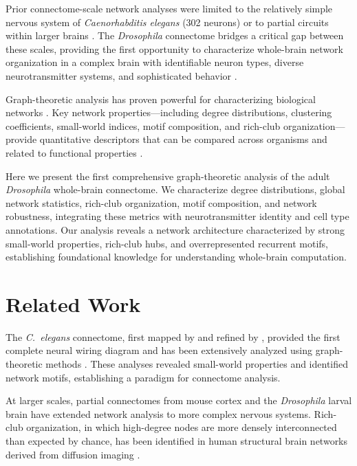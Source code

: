 \documentclass[11pt]{article}
\begin{document}
Prior connectome-scale network analyses were limited to the relatively simple nervous system of \textit{Caenorhabditis elegans} (302 neurons) \citep{white1986structure, varshney2011structural} or to partial circuits within larger brains \citep{loomba2022connectomic, microns2021functional}. The \textit{Drosophila} connectome bridges a critical gap between these scales, providing the first opportunity to characterize whole-brain network organization in a complex brain with identifiable neuron types, diverse neurotransmitter systems, and sophisticated behavior \citep{winding2023connectome, lin2024network}.

Graph-theoretic analysis has proven powerful for characterizing biological networks \citep{bassett2017network, rubinov2010complex}. Key network properties---including degree distributions, clustering coefficients, small-world indices, motif composition, and rich-club organization---provide quantitative descriptors that can be compared across organisms and related to functional properties \citep{milo2002network, colizza2006detecting, watts1998collective}.

Here we present the first comprehensive graph-theoretic analysis of the adult \textit{Drosophila} whole-brain connectome. We characterize degree distributions, global network statistics, rich-club organization, motif composition, and network robustness, integrating these metrics with neurotransmitter identity and cell type annotations. Our analysis reveals a network architecture characterized by strong small-world properties, rich-club hubs, and overrepresented recurrent motifs, establishing foundational knowledge for understanding whole-brain computation.

\section{Related Work}

The \textit{C.~elegans} connectome, first mapped by \citet{white1986structure} and refined by \citet{varshney2011structural}, provided the first complete neural wiring diagram and has been extensively analyzed using graph-theoretic methods \citep{achacoso1991ay, watts1998collective}. These analyses revealed small-world properties and identified network motifs, establishing a paradigm for connectome analysis.

At larger scales, partial connectomes from mouse cortex \citep{microns2021functional, loomba2022connectomic} and the \textit{Drosophila} larval brain \citep{winding2023connectome} have extended network analysis to more complex nervous systems. Rich-club organization, in which high-degree nodes are more densely interconnected than expected by chance, has been identified in human structural brain networks derived from diffusion imaging \citep{vandenheuvel2011rich, colizza2006detecting}.
\end{document}
